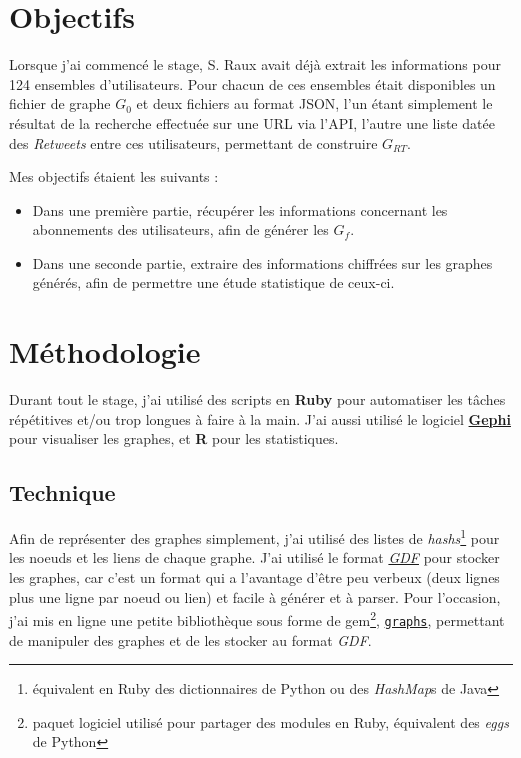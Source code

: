 \documentclass[]{article}
\begin{document}
\section{Objectifs}

Lorsque j'ai commencé le stage, S. Raux avait déjà extrait les
informations pour 124 ensembles d'utilisateurs. Pour chacun de ces
ensembles était disponibles un fichier de graphe $G_{0}$ et deux fichiers
au format JSON, l'un étant simplement le résultat de la recherche
effectuée sur une URL via l'API, l'autre une liste datée des
\emph{Retweets} entre ces utilisateurs, permettant de construire $G_{RT}$.

Mes objectifs étaient les suivants :

\begin{itemize}
\item
  Dans une première partie, récupérer les informations concernant les
  abonnements des utilisateurs, afin de générer les $G_{f}$.
\item
  Dans une seconde partie, extraire des informations chiffrées sur les
  graphes générés, afin de permettre une étude statistique de ceux-ci.
\end{itemize}
\section{Méthodologie}

Durant tout le stage, j'ai utilisé des scripts en \textbf{Ruby} pour
automatiser les tâches répétitives et/ou trop longues à faire à la main.
J'ai aussi utilisé le logiciel \href{https://gephi.org}{\textbf{Gephi}}
pour visualiser les graphes, et \textbf{R} pour les statistiques.

\subsection{Technique}

Afin de représenter des graphes simplement, j'ai utilisé des listes de
\emph{hashs}\footnote{équivalent en Ruby des dictionnaires de Python ou
  des \emph{HashMap}s de Java} pour les noeuds et les liens de chaque
graphe. J'ai utilisé le format
\href{http://guess.wikispot.org/The\_GUESS\_.gdf\_format}{\emph{GDF}}
pour stocker les graphes, car c'est un format qui a l'avantage d'être
peu verbeux (deux lignes plus une ligne par noeud ou lien) et facile à
générer et à parser. Pour l'occasion, j'ai mis en ligne une petite
bibliothèque sous forme de gem\footnote{paquet logiciel utilisé pour
  partager des modules en Ruby, équivalent des \emph{eggs} de Python},
\href{https://rubygems.org/gems/graphs}{\texttt{graphs}}, permettant de
manipuler des graphes et de les stocker au format \emph{GDF}.
\end{document}
